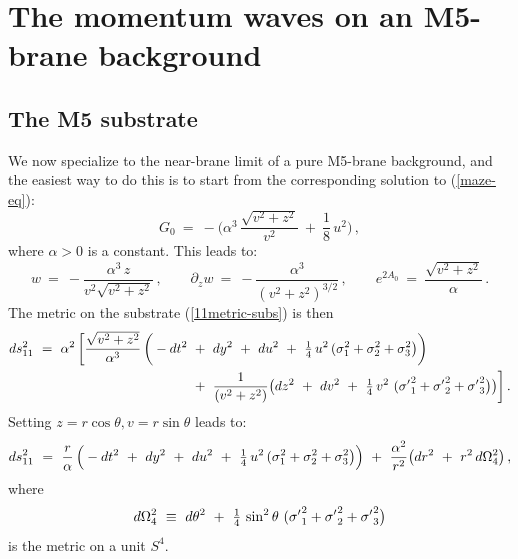 \documentclass[11pt]{article}
\def\coeff#1#2{\relax{\textstyle \frac{#1}{#2}}\displaystyle}
\numberwithin{equation}{section}
\begin{document}
\section{The momentum waves on an M5-brane background}
\label{sec:M5back}

\subsection{The M5 substrate}
\label{ss:substrateM5}


We now specialize to the near-brane limit of a pure M5-brane background, and the easiest way to do this is to start from the corresponding solution to (\ref{maze-eq}):
%
\begin{equation}
G_0 ~=~ - \bigg( \alpha^3\, \frac{\sqrt{v^2 + z^2}}{v^2} ~+~ \frac{1}{8} \, u^2 \bigg)\,, 
 \label{maze-sol1}
\end{equation}
%
where $\alpha >0$ is a constant.
This leads to:
%
\begin{equation}
w ~=~ -  \frac{\alpha^3\,  z }{v^2 \sqrt{v^2 + z^2}} \,, \qquad \partial_z w ~=~ -  \frac{\alpha^3 }{(v^2 + z^2)^{3/2}} \,, \qquad e^{2 A_0} ~=~\frac{\sqrt{v^2 + z^2}} {\alpha } \,. 
 \label{maze-sol2}
\end{equation}
%
The metric on the substrate (\ref{11metric-subs})  is then
%
\begin{equation}
\begin{aligned}
ds_{11}^2 ~=~  \alpha^2\, \bigg[\frac{\sqrt{v^2 + z^2}} {\alpha^3 }\, \bigg( -dt^2 &~+~ dy^2 ~+~  du^2  ~+~ \coeff{1}{4} \, u^2 \, (\sigma_1^2 +\sigma_2^2+ \sigma_3^2 \big) \bigg) \\
& ~+~ \frac{1}{(v^2 + z^2)}\big(   dz^2  ~+~ dv^2  ~+~ \coeff{1}{4} \, v^2 \, \,({\sigma'}_1^2 +{\sigma'}_2^2+{\sigma'}_3^2\big) \big)   \bigg]\,.
\end{aligned}
 \label{11metric-subs-simp1}
\end{equation}
%
Setting $z = r \cos \theta, v = r \sin \theta$ leads to:
%
\begin{equation}
ds_{11}^2 ~=~\frac{r} {\alpha}\, \Big( -dt^2 ~+~ dy^2 ~+~  du^2  ~+~ \coeff{1}{4} \, u^2 \, (\sigma_1^2 +\sigma_2^2+ \sigma_3^2 \big) \Big) \\
~+~ \frac{\alpha^2}{r^2 }\big(   dr^2  ~+~ r^2 \, d\Omega_4^2 \big) \,,
 \label{11metric-subs-simp2}
\end{equation}
%
where 
%
\begin{equation}
d\Omega_4^2 ~\equiv~ d\theta^2  ~+~ \coeff{1}{4} \, \sin^2 \theta \, \,({\sigma'}_1^2 +{\sigma'}_2^2+{\sigma'}_3^2\big)
 \label{4sphere-met}
\end{equation}
%
is the metric on a unit $S^4$.
\end{document}
